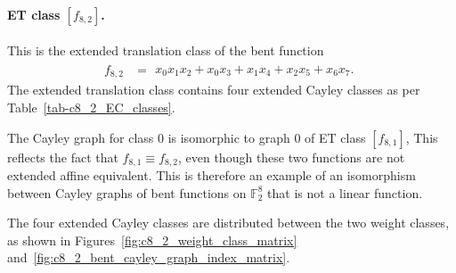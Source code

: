 \documentclass[12pt,a4paper]{article}
\newcommand{\mb}[1]{\mathbb{#1}}
\newcommand{\F}{\mb{F}}
\begin{document}
%
\paragraph*{ET class $[f_{8,2}]$.}
%
This is the extended translation class of the bent function
\small{}
\begin{align*}
f_{ 8 , 2 } &=
\begin{array}{l}
x_{0} x_{1} x_{2} + x_{0} x_{3} + x_{1} x_{4} + x_{2} x_{5} + x_{6} x_{7}.
\end{array}
\end{align*}
\normalsize{}
The extended translation class contains four extended Cayley classes as per Table~\ref{tab-c8_2_EC_classes}.

The Cayley graph for class 0 is isomorphic to graph 0 of ET class $[f_{8,1}]$,
This reflects the fact that $f_{8,1} \equiv f_{8,2}$, even though these two functions are not
extended affine equivalent.
This is therefore an example of an isomorphism between Cayley graphs of bent functions on
$\F_2^8$ that is not a linear function.

The four extended Cayley classes are distributed between the two weight classes,
as shown in Figures~\ref{fig:c8_2_weight_class_matrix} and~\ref{fig:c8_2_bent_cayley_graph_index_matrix}.
\end{document}
